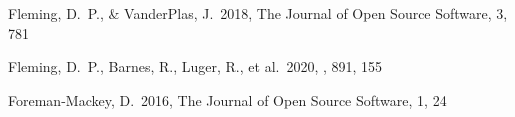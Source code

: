 \documentclass[twocolumn, twocolappendix]{aastex63}
\begin{document}
\begin{itemize}
\begin{thebibliography}{}














 Fleming, D.~P., \& VanderPlas, J.\ 2018, The Journal of Open Source Software, 3, 781


 Fleming, D.~P., Barnes, R., Luger, R., et al.\ 2020, \apj, 891, 155






 Foreman-Mackey, D.\ 2016, The Journal of Open Source Software, 1, 24







 



\end{thebibliography}
\end{itemize}
\end{document}
